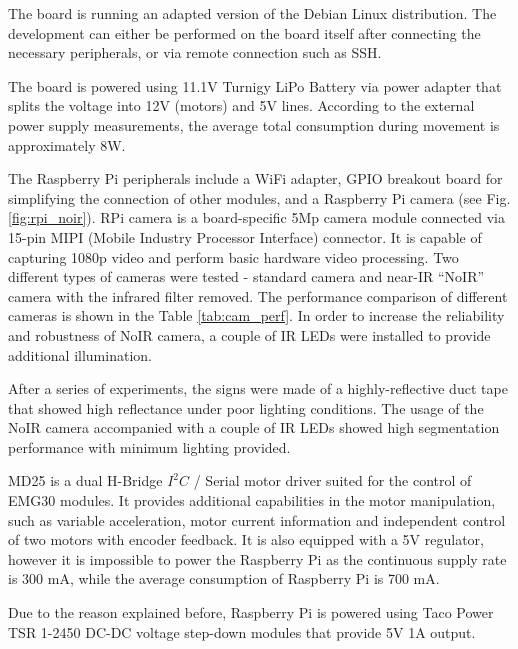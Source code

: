 The board is running an adapted version of the Debian Linux distribution. The
development can either be performed on the board itself after connecting the
necessary peripherals, or via remote connection such as SSH.

The board is powered using 11.1V Turnigy LiPo Battery via power adapter that
splits the voltage into 12V (motors) and 5V lines. According to the external
power supply measurements, the average total consumption during movement is
approximately 8W.

The Raspberry Pi peripherals include a WiFi adapter, GPIO breakout board for
simplifying the connection of other modules, and a Raspberry Pi camera (see
Fig. \ref{fig:rpi_noir}).
RPi camera is a board-specific 5Mp camera module connected via 15-pin MIPI (Mobile Industry
Processor Interface) connector. It is capable of capturing 1080p video and
perform basic hardware video processing. Two different types of cameras were
tested - standard camera and near-IR ``NoIR'' camera with the infrared filter
removed.
The performance comparison of different cameras is shown in the Table
\ref{tab:cam_perf}.  In order to increase the reliability and robustness of 
NoIR camera, a couple of IR LEDs were installed to provide additional illumination.

After a series of experiments, the signs were made of a highly-reflective duct
tape that showed high reflectance under poor lighting
conditions. The usage of the NoIR camera accompanied with a couple of IR LEDs
showed high segmentation performance with minimum lighting provided.

MD25 is a dual H-Bridge $I^2C$ / Serial motor driver suited for the control of
EMG30 modules.
It provides additional capabilities in the motor manipulation, such as variable
acceleration, motor current information and independent control of two motors
with encoder feedback. It is also equipped with a 5V regulator, however it is
impossible to power the Raspberry Pi as the continuous supply rate is 300 mA,
while the average consumption of Raspberry Pi is 700 mA.

Due to the reason explained before, Raspberry Pi is powered using Taco Power TSR
1-2450 DC-DC voltage step-down modules that provide 5V 1A output.


